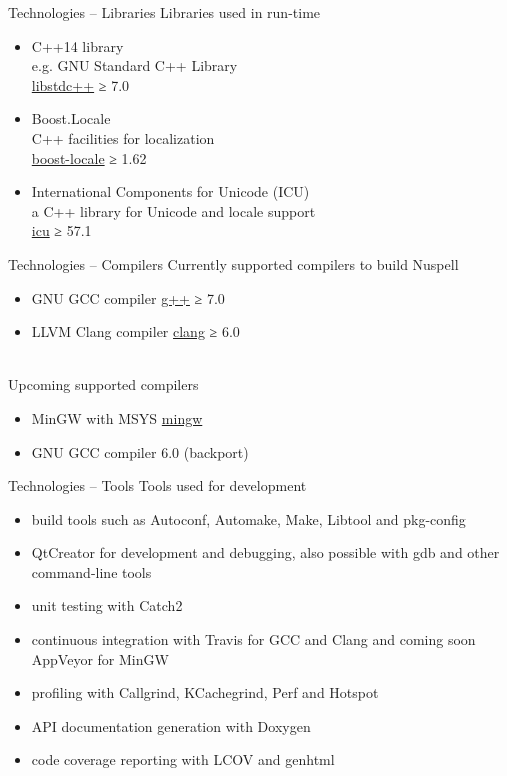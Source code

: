 \documentclass{beamer}
\begin{document}
\begin{frame}{Technologies – Libraries}
Libraries used in run-time
\\\mbox{}
\begin{itemize}
\item C++14 library\\
e.g. GNU Standard C++ Library\\
\href{https://gcc.gnu.org/}{libstdc++} ≥ 7.0
\\\mbox{}
\item Boost.Locale\\
C++ facilities for localization\\
\href{https://www.boost.org/doc/libs/1_69_0/libs/locale/doc/html/index.html}{boost-locale} ≥ 1.62
\\\mbox{}
\item International Components for Unicode (ICU)\\
a C++ library for Unicode and locale support\\
\href{http://site.icu-project.org/}{icu} ≥ 57.1
\end{itemize}
\end{frame}

\begin{frame}{Technologies – Compilers}
Currently supported compilers to build Nuspell
\begin{itemize}
\item GNU GCC compiler \href{https://gcc.gnu.org/}{g++} ≥ 7.0
\item LLVM Clang compiler \href{https://clang.llvm.org/}{clang} ≥ 6.0
\end{itemize}
\mbox{}\\
Upcoming supported compilers
\begin{itemize}
\item MinGW with MSYS \href{http://mingw.org/}{mingw}
\item GNU GCC compiler 6.0 (backport)
\end{itemize}
\end{frame}

\begin{frame}{Technologies – Tools}
Tools used for development
\begin{itemize}
\item build tools such as Autoconf, Automake, Make, Libtool and pkg-config
\item QtCreator for development and debugging, also possible with gdb and other command-line tools
\item unit testing with Catch2
\item continuous integration with Travis for GCC and Clang and coming soon AppVeyor for MinGW
\item profiling with Callgrind, KCachegrind, Perf and Hotspot
\item API documentation generation with Doxygen
\item code coverage reporting with LCOV and genhtml
\end{itemize}
\end{frame}
\end{document}
